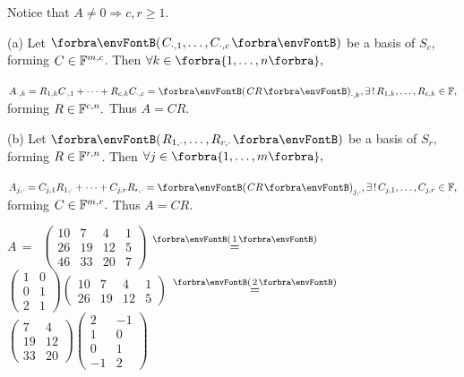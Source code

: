 \documentclass[a4paper, 11pt, UTF8]{article}
\begin{document}
\begin{large}
Notice that $A\neq 0\Rightarrow c,r\geqslant 1.$\vspace{2pt}\par\quad
(a) Let $\Par{C_{\cdot,1},\dots,C_{\cdot,c}}$ be a basis of $S_c$, forming $C\in{\mathbb{F}}^{m,c}$. Then $\forall k\in\Bra{1,\dots,n},$\vspace{2pt}\par\quad\Ha
$A_{\cdot,k}=R_{1,k}C_{\cdot,1}+\dots+R_{c,k}C_{\cdot,c}=\Par{CR}_{\cdot,k},\exists\,!\,R_{1,k},\dots,R_{c,k}\in\Fbb,$ forming $R\in{\mathbb{F}}^{c,n}.$ Thus $A=CR.$\vspace{4pt}\par\quad
(b) Let $\Par{R_{1,\cdot},\dots,R_{r,\cdot}}$ be a basis of $S_r,$ forming $R\in{\mathbb{F}}^{r,n}$. Then $\forall j\in\Bra{1,\dots,m},$\vspace{2pt}\par\quad\Hb
$A_{j,\cdot}=C_{j,1}R_{1,\cdot}+\dots+C_{j,r}R_{r,\cdot}=\Par{CR}_{j,\cdot},\exists\,!\,C_{j,1},\dots,C_{j,r}\in\Fbb,$ forming $C\in{\mathbb{F}}^{m,r}.$ Thus $A=CR.$\PfEnd\vspace{4pt}
\Example\par\quad
$A\,=\,$ {\normalsize$\begin{pmatrix} 10 & 7 & 4 & 1 \\ 26 & 19 & 12 & 5\\ 46 & 33 & 20 & 7\end{pmatrix}$
{$\overset{\Par{1}}{=}$}
$\begin{pmatrix} 1 & 0\\ 0 & 1\\ 2 & 1\end{pmatrix}\begin{pmatrix} 10 & 7 & 4 & 1\\ 26 & 19 & 12 & 5\end{pmatrix}$
{$\overset{\Par{2}}{=}$}
$\begin{pmatrix} 7 & 4\\ 19 & 12\\ 33 & 20\end{pmatrix}\begin{pmatrix} 2 & -1\\ 1 & 0\\ 0 & 1\\ -1 & 2\end{pmatrix}$}\par\quad

\end{large}
\end{document}

